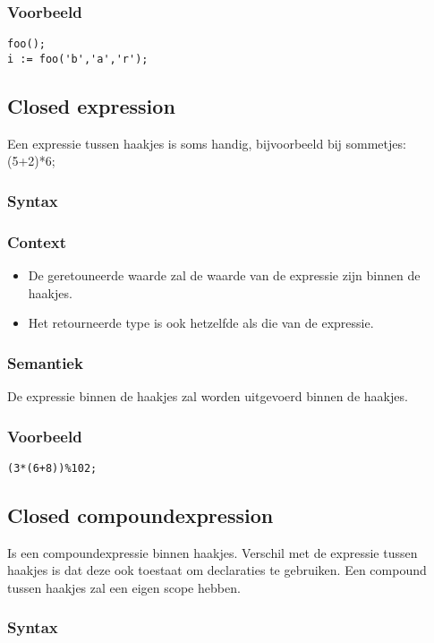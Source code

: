 \documentclass[]{article}
\begin{document}
\subsubsection{Voorbeeld}
\begin{lstlisting}[style=SELMA]
foo();
i := foo('b','a','r');
\end{lstlisting}


\subsection{Closed expression}
Een expressie tussen haakjes is soms handig, bijvoorbeeld bij sommetjes: (5+2)*6;
\subsubsection{Syntax}

\subsubsection{Context}
\begin{itemize}
\item De geretouneerde waarde zal de waarde van de expressie zijn binnen de haakjes.
\item Het retourneerde type is ook hetzelfde als die van de expressie.
\end{itemize}
\subsubsection{Semantiek}
De expressie binnen de haakjes zal worden uitgevoerd binnen de haakjes.
\subsubsection{Voorbeeld}
\begin{lstlisting}[style=SELMA]
(3*(6+8))%102;
\end{lstlisting}

\subsection{Closed compoundexpression}
Is een compoundexpressie binnen haakjes. Verschil met de expressie tussen haakjes is dat deze ook toestaat om declaraties te gebruiken. Een compound tussen haakjes zal een eigen scope hebben.
\subsubsection{Syntax}

\end{document}
